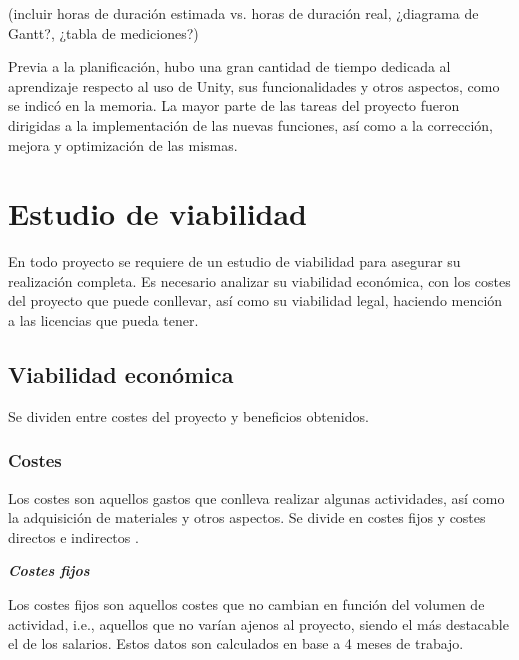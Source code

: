 (incluir horas de duración estimada vs. horas de duración real, ¿diagrama de Gantt?, ¿tabla de mediciones?)

Previa a la planificación, hubo una gran cantidad de tiempo dedicada al aprendizaje respecto al uso de Unity, sus funcionalidades y otros aspectos, como se indicó en la memoria. La mayor parte de las tareas del proyecto fueron dirigidas a la implementación de las nuevas funciones, así como a la corrección, mejora y optimización de las mismas.

\section{Estudio de viabilidad}

En todo proyecto se requiere de un estudio de viabilidad para asegurar su realización completa. Es necesario analizar su viabilidad económica, con los costes del proyecto que puede conllevar, así como su viabilidad legal, haciendo mención a las licencias que pueda tener.

\subsection{Viabilidad económica}

Se dividen entre costes del proyecto y beneficios obtenidos.

\subsubsection{Costes}

Los costes son aquellos gastos que conlleva realizar algunas actividades, así como la adquisición de materiales y otros aspectos. Se divide en costes fijos y costes directos e indirectos \cite{costes}.

\textbf{\textit{Costes fijos}}

Los costes fijos son aquellos costes que no cambian en función del volumen de actividad, i.e., aquellos que no varían ajenos al proyecto, siendo el más destacable el de los salarios. Estos datos son calculados en base a 4 meses de trabajo.

